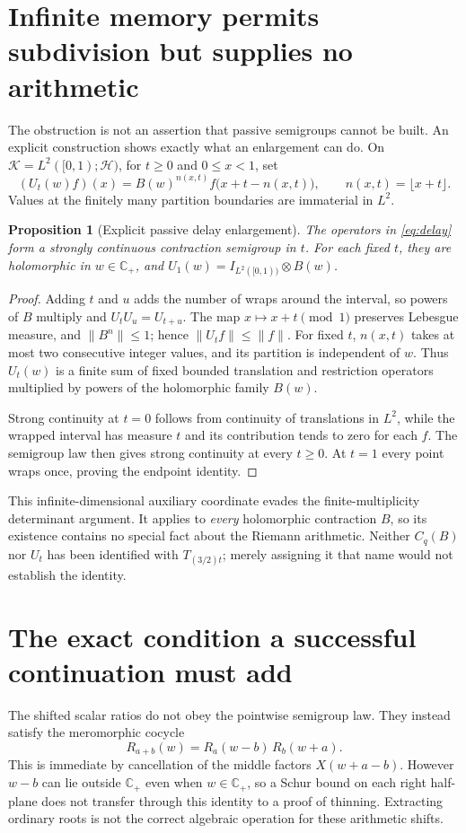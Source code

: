 \documentclass[11pt,letterpaper]{article}
\newtheorem{proposition}[theorem]{Proposition}
\newcommand{\HH}{\mathcal H}
\newcommand{\CP}{\mathbb C_+}
\begin{document}
\section{Infinite memory permits subdivision but supplies no arithmetic}
The obstruction is not an assertion that passive semigroups cannot be built. An explicit construction shows exactly what an enlargement can do. On $\mathcal K=L^2([0,1);\HH)$, for $t\geq0$ and $0\leq x<1$, set
\begin{equation}\label{eq:delay}
 (U_t(w)f)(x)=B(w)^{n(x,t)}f\bigl(x+t-n(x,t)\bigr),
 \qquad n(x,t)=\lfloor x+t\rfloor.
\end{equation}
Values at the finitely many partition boundaries are immaterial in $L^2$.

\begin{proposition}[Explicit passive delay enlargement]
The operators in \eqref{eq:delay} form a strongly continuous contraction semigroup in $t$. For each fixed $t$, they are holomorphic in $w\in\CP$, and $U_1(w)=I_{L^2([0,1))}\otimes B(w)$.
\end{proposition}
\begin{proof}
Adding $t$ and $u$ adds the number of wraps around the interval, so powers of $B$ multiply and $U_tU_u=U_{t+u}$. The map $x\mapsto x+t\pmod1$ preserves Lebesgue measure, and $\|B^n\|\leq1$; hence $\|U_tf\|\leq\|f\|$. For fixed $t$, $n(x,t)$ takes at most two consecutive integer values, and its partition is independent of $w$. Thus $U_t(w)$ is a finite sum of fixed bounded translation and restriction operators multiplied by powers of the holomorphic family $B(w)$.

Strong continuity at $t=0$ follows from continuity of translations in $L^2$, while the wrapped interval has measure $t$ and its contribution tends to zero for each $f$. The semigroup law then gives strong continuity at every $t\geq0$. At $t=1$ every point wraps once, proving the endpoint identity.
\end{proof}

This infinite-dimensional auxiliary coordinate evades the finite-multiplicity determinant argument. It applies to \emph{every} holomorphic contraction $B$, so its existence contains no special fact about the Riemann arithmetic. Neither $C_q(B)$ nor $U_t$ has been identified with $T_{(3/2)t}$; merely assigning it that name would not establish the identity.

\section{The exact condition a successful continuation must add}
The shifted scalar ratios do not obey the pointwise semigroup law. They instead satisfy the meromorphic cocycle
\begin{equation}\label{eq:cocycle}
 R_{a+b}(w)=R_a(w-b)\,R_b(w+a).
\end{equation}
This is immediate by cancellation of the middle factors $X(w+a-b)$. However $w-b$ can lie outside $\CP$ even when $w\in\CP$, so a Schur bound on each right half-plane does not transfer through this identity to a proof of thinning. Extracting ordinary roots is not the correct algebraic operation for these arithmetic shifts.
\end{document}
